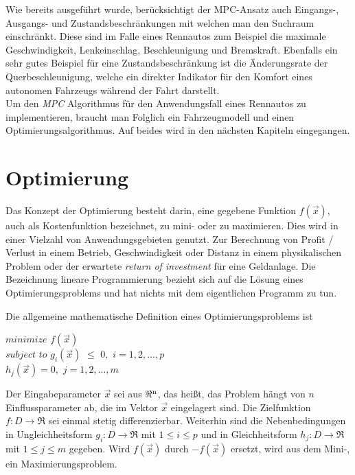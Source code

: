 \documentclass{like}
\begin{document}
Wie bereits ausgeführt wurde, berücksichtigt der \ac{MPC}-Ansatz auch Eingangs-, Ausgangs- und Zustandsbeschränkungen mit welchen man den Suchraum einschränkt. Diese sind im Falle eines Rennautos zum Beispiel die maximale Geschwindigkeit, Lenkeinschlag, Beschleunigung und Bremskraft. Ebenfalls ein sehr gutes Beispiel für eine Zustandsbeschränkung ist die Änderungsrate der Querbeschleunigung, welche ein direkter Indikator für den Komfort eines autonomen Fahrzeugs während der Fahrt darstellt.\\

Um den \textit{\acl{MPC}} Algorithmus für den Anwendungsfall eines Rennautos zu implementieren, braucht man Folglich ein Fahrzeugmodell und einen Optimierungsalgorithmus. Auf beides wird in den nächsten Kapiteln eingegangen.


\section{Optimierung}
Das Konzept der Optimierung besteht darin, eine gegebene Funktion \(f(\vec{x})\), auch als Kostenfunktion bezeichnet, zu mini- oder zu maximieren. 
Dies wird in einer Vielzahl von Anwendungsgebieten genutzt.
Zur Berechnung von Profit / Verlust in einem Betrieb, Geschwindigkeit oder Distanz in einem physikalischen Problem oder der erwartete \textit{return of investment} für eine Geldanlage.  
Die Bezeichnung lineare Programmierung bezieht sich auf die Lösung eines  Optimierungsproblems und hat nichts mit dem eigentlichen Programm zu tun.

Die allgemeine mathematische Definition eines Optimierungsproblems ist

$minimize$  
\noindent\hspace*{3mm}%
$f(\vec{x}) $ \\
$subject$  $to$ 
\noindent\hspace*{3mm}%
$g_i(\vec{x})$ $\leq$ $0,$ $i=1,2,...,p$  \\
\noindent\hspace*{22mm}%
$h_j(\vec{x})= 0,$ $j= 1,2,...,m$\\ 
\noindent\hspace*{22mm}%


Der Eingabeparameter $\vec{x}$ sei aus $\Re \textsuperscript{n} $, das heißt, das Problem hängt von \(n\) Einflussparameter ab, die im Vektor $\vec{x}$ eingelagert sind. Die Zielfunktion $f:D \rightarrow \Re $ sei einmal stetig differenzierbar. Weiterhin sind die Nebenbedingungen in Ungleichheitsform $g_i:D \rightarrow \Re$ mit $1\leq i \leq p$ und in Gleichheitsform $h_j:D \rightarrow \Re$ mit $1\leq j \leq m$ gegeben.
Wird \(f(\vec{x})\) durch \(-f(\vec{x})\) ersetzt, wird aus dem Mini-, ein Maximierungsproblem.  
\end{document}
